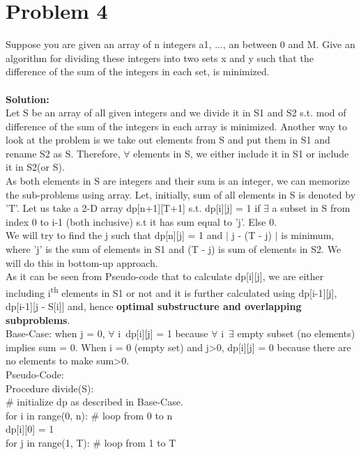 \documentclass{article}
\newcommand\tab[1][4mm]{\hspace*{#1}}
\begin{document}
\section*{Problem 4}
Suppose you are given an array of n integers {a1, ..., an} between 0 and M. Give an algorithm for dividing these integers into two sets x and y such that the difference of the sum of the integers in each set, is minimized. \\
\vspace{1mm} \\
\textbf{Solution:} \\
Let S be an array of all given integers and we divide it in S1 and S2 s.t. mod of difference of the sum of the integers in each array is minimized. Another way to look at the problem is we take out elements from S and put them in S1 and rename S2 as S. Therefore, $\forall$ elements in S, we either include it in S1 or include it in S2(or S). \\
As both elements in S are integers and their sum is an integer, we can memorize the sub-problems using array. Let, initially, sum of all elements in S is denoted by 'T'. Let us take a 2-D array dp[n+1][T+1] s.t. dp[i][j] = 1 if $\exists$ a subset in S from index 0 to i-1 (both inclusive) s.t it has sum equal to 'j'. Else 0. \\
We will try to find the j such that dp[n][j] = 1 and  $\mid$ j - (T - j) $\mid$ is minimum, where 'j' is the sum of elements in S1 and (T - j) is sum of elements in S2. We will do this in bottom-up approach. \\
As it can be seen from Pseudo-code that to calculate dp[i][j], we are either including i\textsuperscript{th} elements in S1 or not and it is further calculated using dp[i-1][j], dp[i-1][j - S[i]] and, hence \textbf{optimal substructure and overlapping subproblems}. \\
Base-Case: when j = 0, $\forall$ i\  dp[i][j] = 1 because $\forall$ i\  $\exists$ empty subset (no elements) implies sum = 0. When i = 0 (empty set) and j\textgreater 0, dp[i][j] = 0 because there are no elements to make sum\textgreater 0. \\
Pseudo-Code: \\
Procedure divide(S): \\
\tab \# initialize dp as described in Base-Case. \\
\tab for  i in range(0, n): \# loop from 0 to n  \\
\tab\tab dp[i][0] = 1 \\
\tab for  j in range(1, T): \# loop from 1 to T  \\
\end{document}
